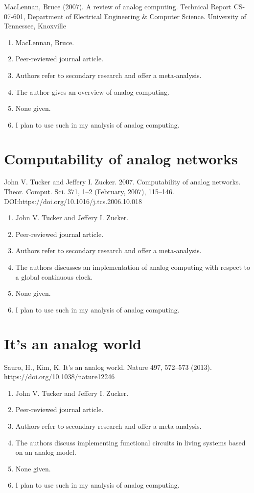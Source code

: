 MacLennan, Bruce (2007). A review of analog computing. Technical Report CS-07-601, Department of Electrical Engineering \& Computer Science. University of Tennessee, Knoxville

\begin{enumerate}
    \item MacLennan, Bruce.
    \item Peer-reviewed journal article.
    \item Authors refer to secondary research and offer a meta-analysis.
    \item The author gives an overview of analog computing.
    \item None given. 
    \item I plan to use such in my analysis of analog computing. 
\end{enumerate}

\section*{Computability of analog networks}

John V. Tucker and Jeffery I. Zucker. 2007. Computability of analog networks. Theor. Comput. Sci. 371, 1–2 (February, 2007), 115–146. DOI:https://doi.org/10.1016/j.tcs.2006.10.018

\begin{enumerate}
    \item John V. Tucker and Jeffery I. Zucker.
    \item Peer-reviewed journal article.
    \item Authors refer to secondary research and offer a meta-analysis.
    \item The authors discusses an implementation of analog computing with respect to a global continuous clock.
    \item None given. 
    \item I plan to use such in my analysis of analog computing. 
\end{enumerate}

\section*{It’s an analog world}
Sauro, H., Kim, K. It's an analog world. Nature 497, 572–573 (2013). https://doi.org/10.1038/nature12246

\begin{enumerate}
    \item John V. Tucker and Jeffery I. Zucker.
    \item Peer-reviewed journal article.
    \item Authors refer to secondary research and offer a meta-analysis.
    \item The authors discuss implementing functional circuits in living systems based on an analog model.
    \item None given. 
    \item I plan to use such in my analysis of analog computing. 
\end{enumerate}


